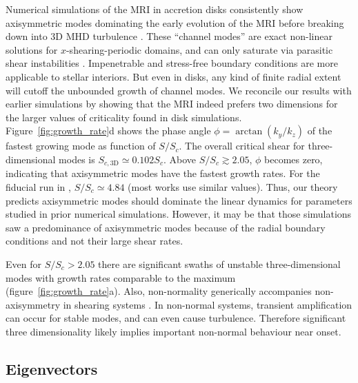 \documentclass[openacc]{rsproca_new}%
\newcommand{\SSC}{S/S_{c}}
\begin{document}
Numerical simulations of the MRI in accretion disks consistently show axisymmetric modes dominating the early evolution of the MRI before breaking down into 3D MHD turbulence \cite{1995ApJ...440..742H,2018ApJ...853..174H,2019ApJS..241...26D}. 
These ``channel modes'' are exact non-linear solutions for $x$-shearing-periodic domains, and can only saturate via parasitic shear instabilities \cite{1994ApJ...432..213G}.
Impenetrable and stress-free boundary conditions are more applicable to stellar interiors. 
But even in disks, any kind of finite radial extent will cutoff the unbounded growth of channel modes. 
We reconcile our results with earlier simulations by showing that the MRI indeed prefers two dimensions for the larger values of criticality found in disk simulations. 
Figure~\ref{fig:growth_rate}d shows the phase angle $\phi=\arctan(k_{y}/k_{z})$ of the fastest growing mode as function of $\SSC$.
The overall critical shear for three-dimensional modes is $S_{c,\text{3D}}\simeq0.102S_c$.
Above $\SSC\gtrsim2.05$, $\phi$ becomes zero, indicating that axisymmetric modes have the fastest growth rates.
For the fiducial run in \cite{1996ApJ...464..690H}, $\SSC\simeq4.84$ (most works use similar values).
Thus, our theory predicts axisymmetric modes should dominate the linear dynamics for parameters studied in prior numerical simulations.
However, it may be that those simulations saw a predominance of axisymmetric modes because of the radial boundary conditions and not their large shear rates.

Even for $\SSC> 2.05$ there are significant swaths of unstable three-dimensional modes with growth rates comparable to the maximum (figure~\ref{fig:growth_rate}a).
Also, non-normality generically accompanies non-axisymmetry in shearing systems \cite{1992MNRAS.255P..25K}.
In non-normal systems, transient amplification can occur for stable modes, and can even cause turbulence.
Therefore significant three dimensionality likely implies important non-normal behaviour near onset.

\subsection{Eigenvectors}
\label{sec:eigenvectors}
\end{document}
